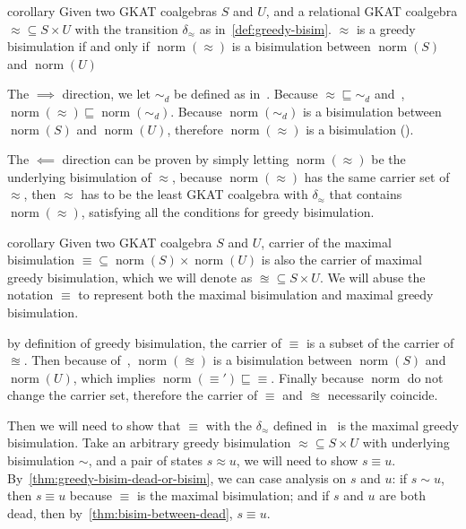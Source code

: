 \documentclass[conference]{IEEEtran}
\DeclareMathOperator{\norm}{\mathrm{norm}}
\begin{document}
\begin{theoremEnd}{corollary}\label{thm:greedy-bisim-iff-norm-bisim}
    Given two GKAT coalgebras \(S\) and \(U\), and a relational GKAT coalgebra \({≈} ⊆ S × U\) with the transition \(δ_≈\) as in~\cref{def:greedy-bisim}.
    \(≈\) is a greedy bisimulation if and only if \(\norm(≈)\) is a bisimulation between \(\norm(S)\) and \(\norm(U)\)
\end{theoremEnd}

\begin{proofEnd}
    The \(⟹\) direction, we let \(∼_d\) be defined as in~.
    Because \({≈} ⊑ {∼_d}\) and~, \(\norm(≈) ⊑ \norm(∼_d)\). 
    Because \(\norm(∼_d)\) is a bisimulation between \(\norm(S)\) and \(\norm(U)\), therefore \(\norm(≈)\) is a bisimulation ().

    The \(⟸\) direction can be proven by simply letting \(\norm(≈)\) be the underlying bisimulation of \(≈\), because \(\norm(≈)\) has the same carrier set of \(≈\), then \(≈\) has to be the least GKAT coalgebra with \(δ_≈\) that contains \(\norm(≈)\), satisfying all the conditions for greedy bisimulation.
\end{proofEnd}

\begin{theoremEnd}{corollary}\label{thm:max-bisim-is-max-greedy-bisim}
    Given two GKAT coalgebra \(S\) and \(U\), carrier of the maximal bisimulation \({≡} ⊆ \norm(S) × \norm(U)\) is also the carrier of maximal greedy bisimulation, which we will denote as \(≊ ⊆ S × U\).
    We will abuse the notation \(≡\) to represent both the maximal bisimulation and maximal greedy bisimulation.
\end{theoremEnd}

\begin{proofEnd}
    by definition of greedy bisimulation, the carrier of \({≡}\) is a subset of the carrier of \({≊}\). 
    Then because of~, \(\norm(≊)\) is a bisimulation between \(\norm(S)\) and \(\norm(U)\), which implies \(\norm(≡') ⊑ {≡}\).
    Finally because \(\norm\) do not change the carrier set, therefore the carrier of \(≡\) and \(≊\) necessarily coincide.

    Then we will need to show that \(≡\) with the \(δ_≈\) defined in~ is the maximal greedy bisimulation.
    Take an arbitrary greedy bisimulation \({≈} ⊆ S × U\) with underlying bisimulation \(∼\), and a pair of states \(s ≈ u\), we will need to show \(s ≡ u\).
    By~\cref{thm:greedy-bisim-dead-or-bisim}, we can case analysis on \(s\) and \(u\): if \(s ∼ u\), then \(s ≡ u\) because \(≡\) is the maximal bisimulation; and if \(s\) and \(u\) are both dead, then by~\cref{thm:bisim-between-dead}, \(s ≡ u\).
\end{proofEnd}
\end{document}
